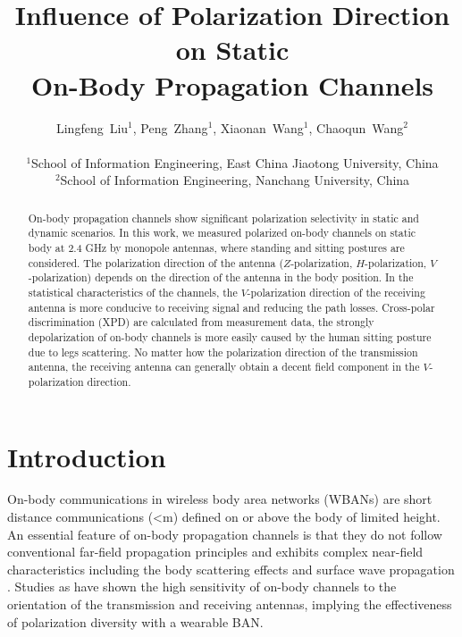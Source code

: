 \documentclass[conference]{IEEEtran}
\begin{document}
\title{Influence of Polarization Direction on Static \\ On-Body Propagation Channels}
\author{Lingfeng~Liu$^1$, Peng~Zhang$^1$, Xiaonan~Wang$^1$, Chaoqun~Wang$^2$\\
\\
$^1$School of Information Engineering, East China Jiaotong University, China \\
$^2$School of Information Engineering, Nanchang University, China}

\maketitle
\begin{abstract}
On-body propagation channels show significant polarization selectivity in static and dynamic scenarios. In this work, we measured polarized on-body channels on static body at 2.4 GHz by monopole antennas, where standing and sitting postures are considered. The polarization direction of the antenna ($Z$-polarization, $H$-polarization, $V$-polarization) depends on the direction of the antenna in the body position. In the statistical characteristics of the channels, the $V$-polarization direction of the receiving antenna is more conducive to receiving signal and reducing the path losses. Cross-polar discrimination (XPD) are calculated from measurement data, the strongly depolarization of on-body channels is more easily caused by the human sitting posture due to legs scattering. No matter how the polarization direction of the transmission antenna, the receiving antenna can generally obtain a decent field component in the $V$-polarization direction.
\end{abstract}


\section{Introduction}
On-body communications in wireless body area networks (WBANs) are short distance communications (\textless{}\;m) \cite{1} defined on or above the body of limited height. An essential feature of on-body propagation channels is that they do not follow conventional far-field propagation principles and exhibits complex near-field characteristics including the body scattering effects \cite{2} and surface wave propagation \cite{3}. Studies as \cite{4} have shown the high sensitivity of on-body channels to the orientation of the transmission and receiving antennas, implying the effectiveness of polarization diversity with a wearable BAN.
\end{document}

